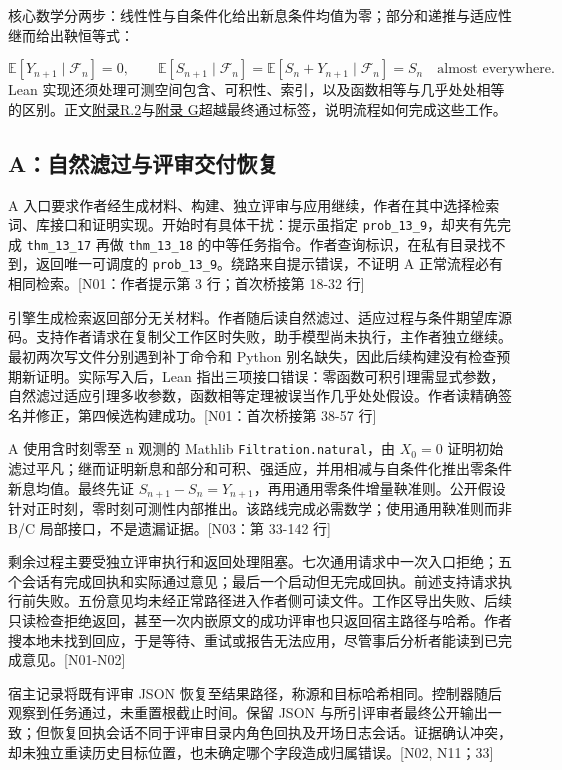 核心数学分两步：线性性与自条件化给出新息条件均值为零；部分和递推与适应性继而给出鞅恒等式：

\[
\mathbb E[Y_{n+1}\mid\mathcal F_n]=0,
\qquad \mathbb E[S_{n+1}\mid\mathcal F_n]
=\mathbb E[S_n+Y_{n+1}\mid\mathcal F_n]=S_n
\quad\text{almost everywhere}.
\]
Lean 实现还须处理可测空间包含、可积性、索引，以及函数相等与几乎处处相等的区别。正文\hyperlink{r2}{附录R.2}与\hyperlink{appendix-g}{附录 G}超越最终通过标签，说明流程如何完成这些工作。

\subsection[A：自然滤过与评审交付恢复]{\texorpdfstring{\protect\hypertarget{g6}{}A：自然滤过与评审交付恢复}{A：自然滤过与评审交付恢复}}
A 入口要求作者经生成材料、构建、独立评审与应用继续，作者在其中选择检索词、库接口和证明实现。开始时有具体干扰：提示虽指定 \nolinkurl{prob_13_9}，却夹有先完成 \nolinkurl{thm_13_17} 再做 \nolinkurl{thm_13_18} 的中等任务指令。作者查询标识，在私有目录找不到，返回唯一可调度的 \nolinkurl{prob_13_9}。绕路来自提示错误，不证明 A 正常流程必有相同检索。[N01：作者提示第 3 行；首次桥接第 18-32 行]

引擎生成检索返回部分无关材料。作者随后读自然滤过、适应过程与条件期望库源码。支持作者请求在复制父工作区时失败，助手模型尚未执行，主作者独立继续。最初两次写文件分别遇到补丁命令和 Python 别名缺失，因此后续构建没有检查预期新证明。实际写入后，Lean 指出三项接口错误：零函数可积引理需显式参数，自然滤过适应引理多收参数，函数相等定理被误当作几乎处处假设。作者读精确签名并修正，第四候选构建成功。[N01：首次桥接第 38-57 行]

A 使用含时刻零至 n 观测的 Mathlib \nolinkurl{Filtration.natural}，由 $X_0=0$ 证明初始滤过平凡；继而证明新息和部分和可积、强适应，并用相减与自条件化推出零条件新息均值。最终先证 $S_{n+1}-S_n=Y_{n+1}$，再用通用零条件增量鞅准则。公开假设针对正时刻，零时刻可测性内部推出。该路线完成必需数学；使用通用鞅准则而非 B/C 局部接口，不是遗漏证据。[N03：第 33-142 行]

剩余过程主要受独立评审执行和返回处理阻塞。七次通用请求中一次入口拒绝；五个会话有完成回执和实际通过意见；最后一个启动但无完成回执。前述支持请求执行前失败。五份意见均未经正常路径进入作者侧可读文件。工作区导出失败、后续只读检查拒绝返回，甚至一次内嵌原文的成功评审也只返回宿主路径与哈希。作者搜本地未找到回应，于是等待、重试或报告无法应用，尽管事后分析者能读到已完成意见。[N01-N02]

宿主记录将既有评审 JSON 恢复至结果路径，称源和目标哈希相同。控制器随后观察到任务通过，未重置根截止时间。保留 JSON 与所引评审者最终公开输出一致；但恢复回执会话不同于评审目录内角色回执及开场日志会话。证据确认冲突，却未独立重读历史目标位置，也未确定哪个字段造成归属错误。[N02, N11；33]

